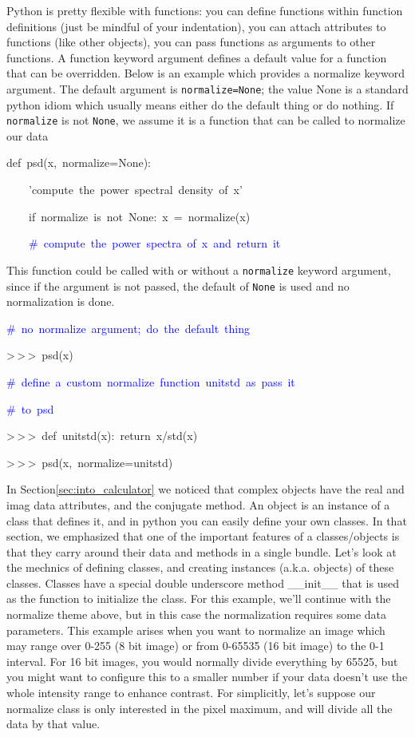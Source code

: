 Python is pretty flexible with functions: you can define functions
within function definitions (just be mindful of your indentation),
you can attach attributes to functions (like other objects), you can
pass functions as arguments to other functions. A function keyword
argument defines a default value for a function that can be overridden.
Below is an example which provides a normalize keyword argument. The
default argument is \texttt{normalize=None}; the value None is a standard
python idiom which usually means either do the default thing or do
nothing. If \texttt{normalize} is not \texttt{None}, we assume it
is a function that can be called to normalize our data

\begin{lyxcode}
def~psd(x,~normalize=None):

~~~~'compute~the~power~spectral~density~of~x'

~~~~if~normalize~is~not~None:~x~=~normalize(x)

~~~\textcolor{blue}{~\#~compute~the~power~spectra~of~x~and~return~it}
\end{lyxcode}
This function could be called with or without a \texttt{normalize}
keyword argument, since if the argument is not passed, the default
of \texttt{None} is used and no normalization is done.

\begin{lyxcode}


\textcolor{blue}{\#~no~normalize~argument;~do~the~default~thing}

>\,{}>\,{}>~psd(x)~~~



\textcolor{blue}{\#~define~a~custom~normalize~function~unitstd~as~pass~it}

\textcolor{blue}{\#~to~psd}

>\,{}>\,{}>~def~unitstd(x):~return~x/std(x)

>\,{}>\,{}>~psd(x,~normalize=unitstd)


\end{lyxcode}
In Section\ref{sec:into_calculator} we noticed that complex objects
have the real and imag data attributes, and the conjugate method.
An object is an instance of a class that defines it, and in python
you can easily define your own classes. In that section, we emphasized
that one of the important features of a classes/objects is that they
carry around their data and methods in a single bundle. Let's look
at the mechnics of defining classes, and creating instances (a.k.a.
objects) of these classes. Classes have a special double underscore
method \_\_init\_\_ that is used as the function to initialize the
class. For this example, we'll continue with the normalize theme above,
but in this case the normalization requires some data parameters.
This example arises when you want to normalize an image which may
range over 0-255 (8 bit image) or from 0-65535 (16 bit image) to the
0-1 interval. For 16 bit images, you would normally divide everything
by 65525, but you might want to configure this to a smaller number
if your data doesn't use the whole intensity range to enhance contrast.
For simplicitly, let's suppose our normalize class is only interested
in the pixel maximum, and will divide all the data by that value.

